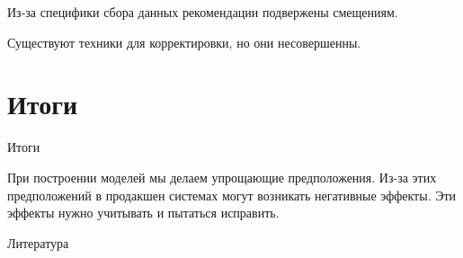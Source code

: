 \documentclass[11pt,aspectratio=169]{beamer}
\begin{document}
\begin{frame}

\begin{tcolorbox}[colback=info!5,colframe=info!80,title=]
Из-за специфики сбора данных рекомендации подвержены смещениям. 
\end{tcolorbox}
\begin{tcolorbox}[colback=info!5,colframe=info!80,title=]
Существуют техники для корректировки, но они несовершенны.
\end{tcolorbox}

\end{frame}

\section{Итоги}

\begin{frame}{Итоги}

\begin{tcolorbox}[colback=info!5,colframe=info!80,title=]
При построении моделей мы делаем упрощающие предположения. Из-за этих предположений в продакшен системах могут возникать негативные эффекты. Эти эффекты нужно учитывать и пытаться исправить.
\end{tcolorbox}

\end{frame}

\begin{frame}[allowframebreaks]{Литература}




\end{frame}
\end{document}
